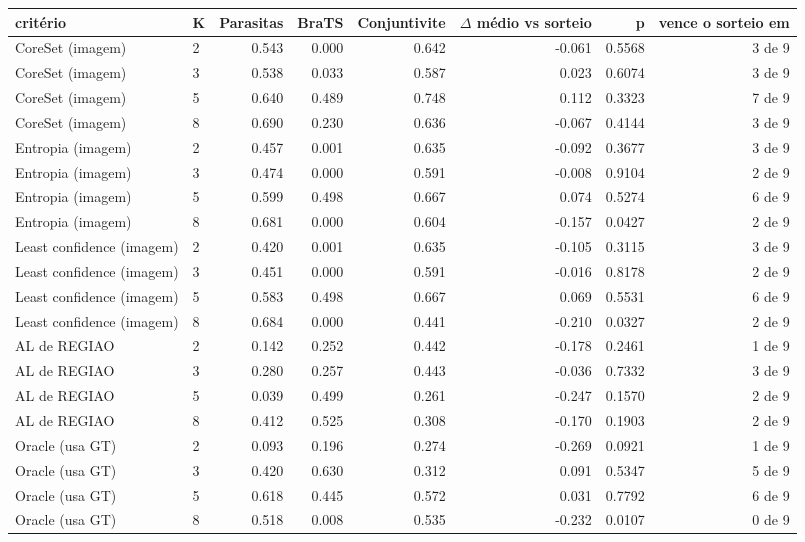 \begin{adjustbox}{max width=\linewidth}
\begin{tabular}{llrrrrrr}
\toprule
critério & K & Parasitas & BraTS & Conjuntivite & $\Delta$ médio vs sorteio & p & vence o sorteio em \\
\midrule
CoreSet (imagem) & 2 & 0.543 & 0.000 & 0.642 & -0.061 & 0.5568 & 3 de 9 \\
CoreSet (imagem) & 3 & 0.538 & 0.033 & 0.587 & 0.023 & 0.6074 & 3 de 9 \\
CoreSet (imagem) & 5 & 0.640 & 0.489 & 0.748 & 0.112 & 0.3323 & 7 de 9 \\
CoreSet (imagem) & 8 & 0.690 & 0.230 & 0.636 & -0.067 & 0.4144 & 3 de 9 \\
Entropia (imagem) & 2 & 0.457 & 0.001 & 0.635 & -0.092 & 0.3677 & 3 de 9 \\
Entropia (imagem) & 3 & 0.474 & 0.000 & 0.591 & -0.008 & 0.9104 & 2 de 9 \\
Entropia (imagem) & 5 & 0.599 & 0.498 & 0.667 & 0.074 & 0.5274 & 6 de 9 \\
Entropia (imagem) & 8 & 0.681 & 0.000 & 0.604 & -0.157 & 0.0427 & 2 de 9 \\
Least confidence (imagem) & 2 & 0.420 & 0.001 & 0.635 & -0.105 & 0.3115 & 3 de 9 \\
Least confidence (imagem) & 3 & 0.451 & 0.000 & 0.591 & -0.016 & 0.8178 & 2 de 9 \\
Least confidence (imagem) & 5 & 0.583 & 0.498 & 0.667 & 0.069 & 0.5531 & 6 de 9 \\
Least confidence (imagem) & 8 & 0.684 & 0.000 & 0.441 & -0.210 & 0.0327 & 2 de 9 \\
AL de REGIAO & 2 & 0.142 & 0.252 & 0.442 & -0.178 & 0.2461 & 1 de 9 \\
AL de REGIAO & 3 & 0.280 & 0.257 & 0.443 & -0.036 & 0.7332 & 3 de 9 \\
AL de REGIAO & 5 & 0.039 & 0.499 & 0.261 & -0.247 & 0.1570 & 2 de 9 \\
AL de REGIAO & 8 & 0.412 & 0.525 & 0.308 & -0.170 & 0.1903 & 2 de 9 \\
Oracle (usa GT) & 2 & 0.093 & 0.196 & 0.274 & -0.269 & 0.0921 & 1 de 9 \\
Oracle (usa GT) & 3 & 0.420 & 0.630 & 0.312 & 0.091 & 0.5347 & 5 de 9 \\
Oracle (usa GT) & 5 & 0.618 & 0.445 & 0.572 & 0.031 & 0.7792 & 6 de 9 \\
Oracle (usa GT) & 8 & 0.518 & 0.008 & 0.535 & -0.232 & 0.0107 & 0 de 9 \\
\bottomrule
\end{tabular}
\end{adjustbox}
